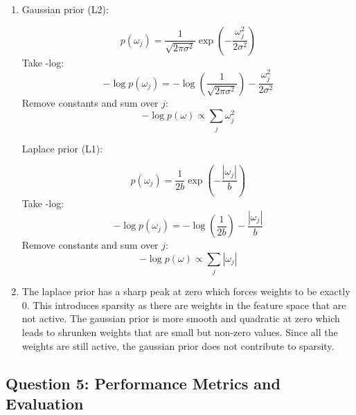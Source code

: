 \begin{enumerate}[label=\textbf{(\alph*)}, leftmargin=*, align=left]
\begin{enumerate}[label=\roman*., topsep=0pt, itemsep=2pt]
                    \[\omega^* = \arg\max_{\omega} p(D|\omega) p(\omega)\]
                    Take the negative log-likelihood so that it becomes a minimisation problem:
                    \[\omega^* = \arg\min_{\omega} (-\log p(D|\omega) - \log p(\omega))\]
                    
                \item Gaussian prior (L2):
                
                      \[p(\omega_j) = \frac{1}{\sqrt{2 \pi \sigma^2}} \exp (-\frac{\omega_j^2}{2\sigma^2})\]
                      Take -log:
                      \[- \log p(\omega_j) = - \log (\frac{1}{\sqrt{2 \pi \sigma^2}}) -\frac{\omega_j^2}{2\sigma^2}\]
                      Remove constants and sum over $j$:
                      \[- \log p(\omega) \propto \sum_{j} \omega_j^2\]

                      Laplace prior (L1):

                      \[p(\omega_j) = \frac{1}{2 b} \exp (-\frac{|\omega_j|}{b})\]
                      Take -log:
                      \[- \log p(\omega_j) = - \log(\frac{1}{2 b}) - \frac{|\omega_j|}{b}\]
                      Remove constants and sum over $j$:
                      \[- \log p(\omega) \propto \sum_{j} |\omega_j|\]

                \item The laplace prior has a sharp peak at zero which forces weights to be exactly 0. This introduces sparsity as there are weights in the feature space that are not active.
                      The gaussian prior is more smooth and quadratic at zero which leads to shrunken weights that are small but non-zero values. Since all the weights are still active, the gaussian
                      prior does not contribute to sparsity. 
            \end{enumerate}
    
\end{enumerate}

\subsection{Question 5: Performance Metrics and Evaluation}

